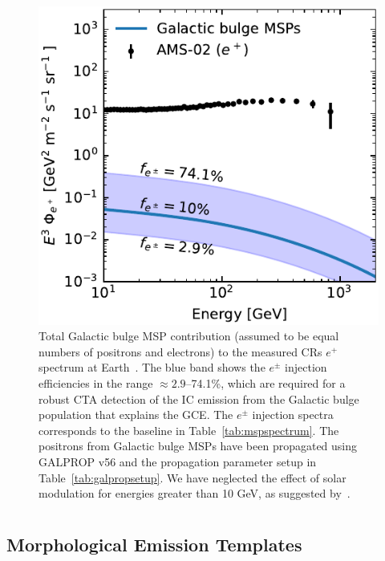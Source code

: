 \documentclass[doublespace,nopageskip]{VTthesis} %
\begin{document}
\begin{appendices}
\begin{figure}
    \begin{center}
    \includegraphics[scale =1]{Figures/CTA/positrons_at_Earth.pdf}
    \caption{Total Galactic bulge MSP contribution (assumed to be equal numbers of positrons and electrons) to the measured CRs $e^+$ spectrum at Earth~\citep{Aguilar:2021tos}. The blue band shows the $e^\pm$ injection efficiencies in the range $\approx 2.9$--74.1\%, which are required for a robust CTA detection of the IC emission from the Galactic bulge population that explains the GCE. The $e^\pm$ injection spectra corresponds to the baseline in Table~\ref{tab:mspspectrum}.  The positrons from Galactic bulge MSPs have been propagated using \textsc{GALPROP} v56 and the propagation parameter setup in Table~\ref{tab:galpropsetup}. We have neglected the effect of solar modulation for energies greater than 10 GeV, as suggested by~\citet{Strauss:2015}.}\label{fig:MSPpositronsatEarth}
    \end{center}
    
  \end{figure}

  \chapter{}\label{app:C}

	\section{Morphological Emission Templates}\label{sec:emission_templates}
	

\end{appendices}
\end{document}

